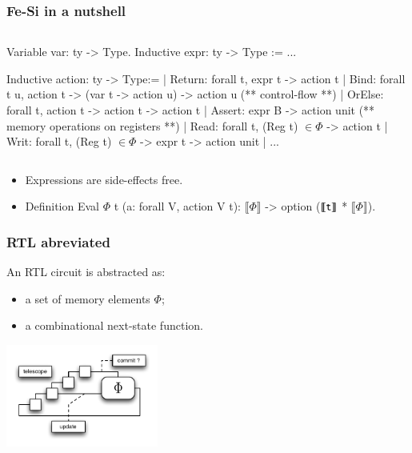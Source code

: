 \documentclass[9pt]{beamer}
\newcommand\denote[1]{\llbracket #1 \rrbracket}
\newcommand\fesi{Fe-Si}
\begin{document}
\begin{frame}[fragile]
  \frametitle{\fesi{} in a nutshell}
  \begin{columns}

\begin{coq}
Variable var: ty -> Type. 
Inductive expr: ty -> Type := ...

Inductive action: ty -> Type:=
| Return: forall t, expr t -> action t
| Bind: forall t u,  action  t -> (var t -> action u) -> action u
(** control-flow **)
| OrElse: forall t, action t -> action t -> action t
| Assert: expr B -> action unit    
(** memory operations on registers **)
| Read: forall t, (Reg t) $\in \Phi$ -> action t
| Writ: forall t, (Reg t) $\in \Phi$ -> expr t -> action unit
| ... 
\end{coq}
    \end{columns}
\begin{itemize}
\item Expressions are side-effects free. 
\item \vspace{-.5em}
  \begin{coq}
Definition Eval $\Phi$ t (a: forall V, action V t): $\denote\Phi$ -> option ($\denote{\tt t}$ * $\denote\Phi$).
\end{coq}
\end{itemize}

\end{frame}
\begin{frame}[fragile]
  \frametitle{RTL abreviated}
  
  An RTL circuit is abstracted as:
  \begin{itemize}
  \item a set of memory elements $\Phi$;
  \item a combinational next-state function.
  \end{itemize}
  
  \begin{center}
    \includegraphics[width=5cm]{figs/rtl.pdf}  
  \end{center}

\end{frame}
\end{document}
